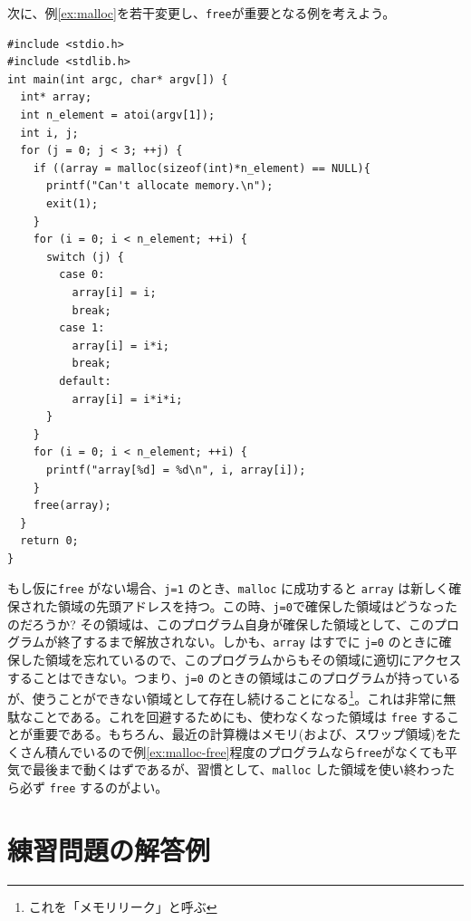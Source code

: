 次に、例\ref{ex:malloc}を若干変更し、\verb|free|が重要となる例を考えよう。
\begin{reidai}\label{ex:malloc-free}
\begin{verbatim}
#include <stdio.h>
#include <stdlib.h>
int main(int argc, char* argv[]) {
  int* array;
  int n_element = atoi(argv[1]);
  int i, j;
  for (j = 0; j < 3; ++j) {
    if ((array = malloc(sizeof(int)*n_element) == NULL){
      printf("Can't allocate memory.\n");
      exit(1);
    }
    for (i = 0; i < n_element; ++i) {
      switch (j) {
        case 0:
          array[i] = i;
          break;
        case 1:
          array[i] = i*i;
          break;
        default:
          array[i] = i*i*i;
      }
    }
    for (i = 0; i < n_element; ++i) {
      printf("array[%d] = %d\n", i, array[i]);
    }
    free(array);
  }
  return 0;
}
\end{verbatim}
\end{reidai} \noindent
もし仮に\verb|free| がない場合、\verb|j=1| のとき、\verb|malloc| に成功すると \verb|array| は新しく確保された領域の先頭アドレスを持つ。この時、\verb|j=0|で確保した領域はどうなったのだろうか? その領域は、このプログラム自身が確保した領域として、このプログラムが終了するまで解放されない。しかも、\verb|array| はすでに \verb|j=0| のときに確保した領域を忘れているので、このプログラムからもその領域に適切にアクセスすることはできない。つまり、\verb|j=0| のときの領域はこのプログラムが持っているが、使うことができない領域として存在し続けることになる\footnote{これを「メモリリーク」と呼ぶ}。これは非常に無駄なことである。これを回避するためにも、使わなくなった領域は \verb|free| することが重要である。もちろん、最近の計算機はメモリ(および、スワップ領域)をたくさん積んでいるので例\ref{ex:malloc-free}程度のプログラムなら\verb|free|がなくても平気で最後まで動くはずであるが、習慣として、\verb|malloc| した領域を使い終わったら必ず \verb|free| するのがよい。

\section{練習問題の解答例}

